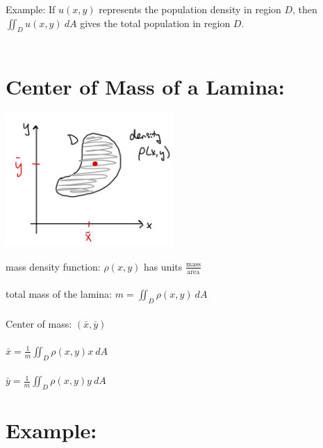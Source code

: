 Example: If \(u(x,y)\) represents the population density in region \(D\), then \(\iint_D u(x,y)\ dA\) gives the total population in region \(D\).\\~\\

\vspace*{.1in}


\section*{Center of Mass of a Lamina:}


\includegraphics[height=2in]{Ch12s4-Lamina.png}

mass density function: \(\rho(x,y)\) has units \(\frac{\text{mass}}{\text{area}}\)\\~\\
total mass of the lamina: \(m = \iint_D \rho(x,y)\ dA\)\\~\\
Center of mass: \((\bar{x},\bar{y})\)\\~\\
\(\bar{x} = \frac{1}{m}\iint_D \rho(x,y) x\ dA\)\\~\\
\(\bar{y} = \frac{1}{m}\iint_D \rho(x,y) y\ dA\)









\section*{Example:}


